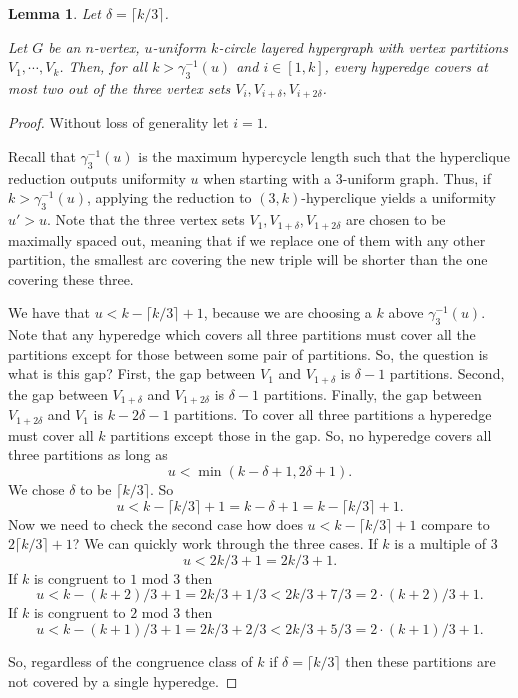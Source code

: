 \documentclass[11pt,letterpaper,pdftex]{article}
\newtheorem{lemma}[theorem]{Lemma}
\begin{document}
\begin{lemma} \label{lem: triangle partitions}
    Let $\delta = \lceil k/3 \rceil$.

    Let $G$ be an $n$-vertex, $u$-uniform $k$-circle layered hypergraph with vertex partitions $V_1, \cdots, V_k$.
    Then, for all $k>\gamma_3^{-1}(u)$ and $i \in [1,k]$, every hyperedge covers at most two out of the three vertex sets $V_i,V_{i+\delta},V_{i+2\delta}$.
\end{lemma}
\begin{proof}
    Without loss of generality let $i =1$. 
    
    Recall that $\gamma_3^{-1}(u)$ is the maximum hypercycle length such that the hyperclique reduction outputs uniformity $u$ when starting with a $3$-uniform graph.
    Thus, if $k>\gamma_3^{-1}(u)$, applying the reduction to $(3,k)$-hyperclique yields a uniformity $u'>u$.
    Note that the three vertex sets $V_1,V_{1+\delta},V_{1+2\delta}$ are chosen to be maximally spaced out, meaning that if we replace one of them with any other partition, the smallest arc covering the new triple will be shorter than the one covering these three.

    We have that $u < k - \lceil k/3 \rceil +1$, because we are choosing a $k$ above $\gamma_3^{-1}(u)$. Note that any hyperedge which covers all three partitions must cover all the partitions except for those between some pair of partitions. So, the question is what is this gap? First, the gap between $V_1$ and $V_{1+\delta}$ is $\delta-1$ partitions. Second, the gap between $V_{1+\delta}$ and $V_{1+2\delta}$ is $\delta-1$ partitions. Finally, the gap between $V_{1+2\delta}$ and $V_1$ is $k-2\delta-1$ partitions. To cover all three partitions a hyperedge must cover all $k$ partitions except those in the gap. So, no hyperedge covers all three partitions as long as 
    $$u < \min(k-\delta+1, 2\delta+1).$$
    We chose $\delta$ to be $\lceil k/3 \rceil$. So
    $$u < k - \lceil k/3 \rceil +1 = k-\delta +1 = k -  \lceil k/3 \rceil +1. $$
    Now we need to check the second case how does 
    $u < k - \lceil k/3 \rceil +1$ compare to $2 \lceil k/3 \rceil + 1$? We can quickly work through the three cases. If $k$ is a multiple of 3 
    $$u < 2k/3+1 = 2k/3 +1.$$
    If $k$ is congruent to $1$ mod 3 then 
    $$u < k - (k+2)/3 +1 = 2k/3 + 1/3 < 2k/3 + 7/3 = 2 \cdot (k+2)/3 +1.$$
    If $k$ is congruent to $2$ mod 3 then 
    $$u < k - (k+1)/3 +1 = 2k/3 + 2/3 < 2k/3 + 5/3 = 2 \cdot (k+1)/3  +1.$$

    So, regardless of the congruence class of $k$ if $\delta = \lceil k/3 \rceil$ then these partitions are not covered by a single hyperedge.



\end{proof}
\end{document}
